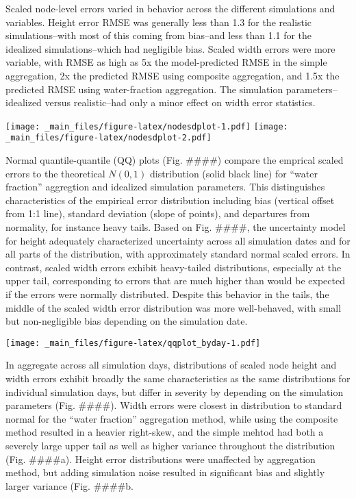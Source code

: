 \documentclass[]{book}
\begin{document}
Scaled node-level errors varied in behavior across the different simulations and variables. Height error RMSE was generally less than 1.3 for the realistic simulations--with most of this coming from bias--and less than 1.1 for the idealized simulations--which had negligible bias. Scaled width errors were more variable, with RMSE as high as 5x the model-predicted RMSE in the simple aggregation, 2x the predicted RMSE using composite aggregation, and 1.5x the predicted RMSE using water-fraction aggregation. The simulation parameters--idealized versus realistic--had only a minor effect on width error statistics.

\texttt{[image: \_main\_files/figure-latex/nodesdplot-1.pdf]} \texttt{[image: \_main\_files/figure-latex/nodesdplot-2.pdf]}

Normal quantile-quantile (QQ) plots (Fig. \#\#\#\#) compare the emprical scaled errors to the theoretical \(N(0, 1)\) distribution (solid black line) for ``water fraction'' aggregtion and idealized simulation parameters. This distinguishes characteristics of the empirical error distribution including bias (vertical offset from 1:1 line), standard deviation (slope of points), and departures from normality, for instance heavy tails. Based on Fig. \#\#\#\#, the uncertainty model for height adequately characterized uncertainty across all simulation dates and for all parts of the distribution, with approximately standard normal scaled errors. In contrast, scaled width errors exhibit heavy-tailed distributions, especially at the upper tail, corresponding to errors that are much higher than would be expected if the errors were normally distributed. Despite this behavior in the tails, the middle of the scaled width error distribution was more well-behaved, with small but non-negligible bias depending on the simulation date.

\texttt{[image: \_main\_files/figure-latex/qqplot\_byday-1.pdf]}

In aggregate across all simulation days, distributions of scaled node height and width errors exhibit broadly the same characteristics as the same distributions for individual simulation days, but differ in severity by depending on the simulation parameters (Fig. \#\#\#\#). Width errors were closest in distribution to standard normal for the ``water fraction'' aggregation method, while using the composite method resulted in a heavier right-skew, and the simple mehtod had both a severely large upper tail as well as higher variance throughout the distribution (Fig. \#\#\#\#a). Height error distributions were unaffected by aggregation method, but adding simulation noise resulted in significant bias and slightly larger variance (Fig. \#\#\#\#b.
\end{document}
